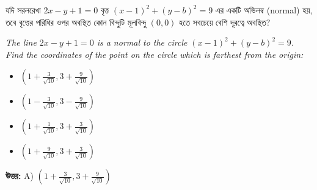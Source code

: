 \documentclass[12pt, a4paper]{article}
\begin{document}
\vspace{2em}

\begin{tcolorbox}[questionbox={প্রশ্ন (Question) 21}]
    \noindent
    যদি সরলরেখা $2x - y + 1 = 0$ বৃত্ত $(x - 1)^2 + (y - b)^2 = 9$ এর একটি অভিলম্ব (normal) হয়, তবে বৃত্তের পরিধির ওপর অবস্থিত কোন বিন্দুটি মূলবিন্দু $(0,0)$ হতে সবচেয়ে বেশি দূরত্বে অবস্থিত?
    
    \vspace{0.8em}
    \begin{english}
    \noindent\textit{\color{darkgray}
    The line $2x - y + 1 = 0$ is a normal to the circle $(x - 1)^2 + (y - b)^2 = 9$. Find the coordinates of the point on the circle which is farthest from the origin:
    }
    \end{english}
\end{tcolorbox}

\begin{itemize}[label={}, leftmargin=1cm, itemsep=0.5em]
    \item[\textbf{A)}] $\left(1 + \frac{3}{\sqrt{10}}, 3 + \frac{9}{\sqrt{10}}\right)$
    \item[\textbf{B)}] $\left(1 - \frac{3}{\sqrt{10}}, 3 - \frac{9}{\sqrt{10}}\right)$
    \item[\textbf{C)}] $\left(1 + \frac{1}{\sqrt{10}}, 3 + \frac{3}{\sqrt{10}}\right)$
    \item[\textbf{D)}] $\left(1 + \frac{9}{\sqrt{10}}, 3 + \frac{3}{\sqrt{10}}\right)$
\end{itemize}

\vspace{0.5em}
\begin{tcolorbox}[answerbox]
    \textbf{\color{success} উত্তর:} A) $\left(1 + \frac{3}{\sqrt{10}}, 3 + \frac{9}{\sqrt{10}}\right)$
\end{tcolorbox}
\vspace{1em}
\end{document}
